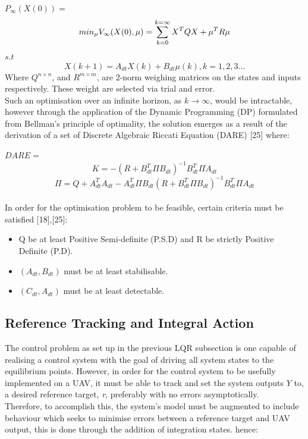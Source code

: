 \documentclass[12pt,a4paper,twoside]{report}
\begin{document}
				\(P_\infty(X(0)) = \)				
				\begin{equation}
					min_\mu  V_\infty(X(0),\emph{\emph{$\mu$}}) = \sum_{k = 0}^{k = \infty} X^{T} Q X + \mu^{T} R \mu
				\end{equation}
				\(s.t\)
				\[
					X(k+1) = A_{dt}X(k) + B_{dt} \mu(k) , k=1,2,3\dots
				\]
				Where $Q^{n \times n}$, and $R^{m \times m}$, are 2-norm weighing matrices on the states and inputs respectively. These weight are selected via trial and error.
				\\
				Such an optimisation over an infinite horizon, as \(k \to \infty \), would be intractable, however through the application of the Dynamic Programming (DP) formulated from Bellman's principle of optimality, the solution emerges as a result of the derivation of a set of Discrete Algebraic Riccati Equation (DARE) [25] where:
				
				\(DARE = \)
				\[
					K = - (R + B_{dt}^{T} \Pi B_{dt})^{-1} B_{dt}^{T} \Pi A_{dt}
				\]
				\begin{equation}
					\Pi = Q + A_{dt}^{T} A_{dt} - A_{dt}^{T} \Pi B_{dt}(R + B_{dt}^{T} \Pi B_{dt})^{-1} B_{dt}^{T} \Pi A_{dt}
				\end{equation}
				\\
				In order for the optimisation problem to be feasible, certain criteria must be satisfied [18],[25]:
				
				\begin{itemize}
					\item
						Q be at least Positive Semi-definite (P.S.D) and R be strictly Positive Definite (P.D).
					\item
						\( (A_{dt},B_{dt}) \) must be at least stabilisable.
					\item
						\( (C_{dt},A_{dt}) \) must be at least detectable.
				\end{itemize} 
			
			\subsection{Reference Tracking and Integral Action}
				
				The control problem as set up in the previous LQR subsection is one capable of realising a control system with the goal of driving all system states to the equilibrium points. However, in order for the control system to be usefully implemented on a UAV, it must be able to track and set the system outputs $Y$ to, a desired reference target, \emph{\emph{r}}, preferably with no errors asymptotically.
				\\
				Therefore, to accomplish this, the system's model must be augmented to include behaviour which seeks to minimise errors between a reference target and UAV output, this is done through the addition of integration states. hence:
				
\end{document}
